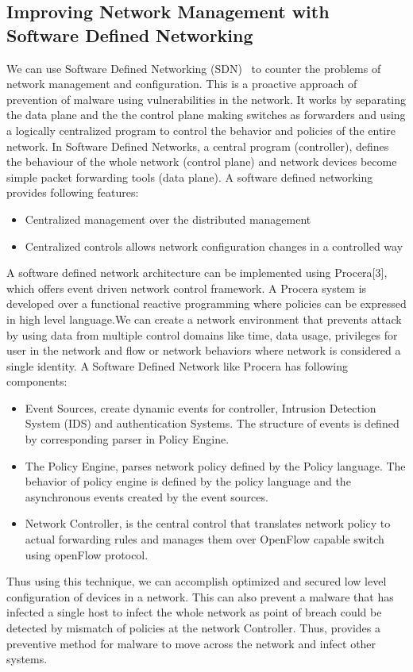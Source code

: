 \documentclass[11pt]{article}
\begin{document}
	\subsection{Improving Network Management with Software Defined Networking}
	We can use Software Defined Networking (SDN)~\cite{kim2013improving} to counter the problems of network management and configuration. This is a proactive approach of prevention of malware using vulnerabilities in the network. It works by separating the data plane and the the control plane making switches as forwarders and using a logically centralized program to control the behavior and policies of the entire network. In Software Defined Networks, a central program (controller), defines the behaviour of the whole network (control plane) and network devices become simple packet forwarding tools (data plane).
	A software defined networking provides following features:
	\begin{itemize}
		\item Centralized management over the distributed management
		\item Centralized controls allows network configuration changes in a controlled way
	\end{itemize}
	 A software defined network architecture can be implemented using Procera[3], which offers event driven network control framework. A Procera system is developed over a functional reactive programming where policies can be expressed in high level language.We can create a network environment that prevents attack by using data from multiple control domains like time, data usage, privileges for user in the network and flow or network behaviors where network is considered a single identity. 
	 A Software Defined Network like Procera has following components:
	 \begin{itemize}
	 	\item Event Sources, create dynamic events for controller, Intrusion Detection System (IDS) and authentication Systems. The structure of events is defined by corresponding parser in Policy Engine.
		\item The Policy Engine, parses network policy defined by the Policy language. The behavior of policy engine is defined by the policy language and the asynchronous events created by the event sources.
		\item Network Controller, is the central control that translates network policy to actual forwarding rules and manages them over OpenFlow capable switch using openFlow protocol.
	 \end{itemize}
		Thus using this technique, we can accomplish optimized and secured low level configuration of devices in a network. This can also prevent a malware that has infected a single host to infect the whole network as point of breach could be detected by mismatch of policies at the network Controller. Thus, provides a preventive method for malware to move across the network and infect other systems.
	
\end{document}
